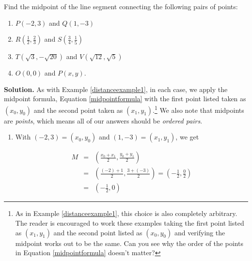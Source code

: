 \documentclass{ximera}
\begin{document}
\begin{example} 

Find the midpoint of the line segment connecting the following pairs of points:  



\begin{enumerate}

\item $P(-2,3)$ and  $Q(1,-3)$ 

\item $R\left( \frac{1}{2}, \frac{2}{3}\right)$ and $S\left( \frac{3}{4}, \frac{1}{5}\right)$ 


\item  $T(\sqrt{3}, -\sqrt{20})$ and $V(\sqrt{12}, \sqrt{5})$

\item   $O(0,0)$ and $P(x,y)$. 

\end{enumerate}


 

{\bf Solution.}  As with Example \ref{distanceexample1}, in each case, we apply the midpoint formula, Equation \ref{midpointformula} with the first point listed taken as  $\left(x_0, y_0\right)$ and the second point taken as $\left(x_1, y_1\right)$.\footnote{As in Example \ref{distanceexample1}, this choice is also completely arbitrary.  The reader is encouraged to work these examples taking the first point listed as $\left(x_1, y_1\right)$ and the second point listed as $\left(x_0, y_0\right)$ and verifying the midpoint works out to be the same.  Can you see why the order of the points in Equation \ref{midpointformula} doesn't matter?}  We also note that midpoints are \textit{points}, which means all of our answers should be \textit{ordered pairs}.

\begin{enumerate}

\item  With $(-2,3) =  \left(x_0, y_0\right)$ and  $(1,-3) = \left(x_1, y_1\right)$, we get

\setlength{\extrarowheight}{10pt}

\[ \begin{array}{rcl}
 M & = & \left( \frac{x_0+x_1}{2},  \frac{y_0+y_1}{2} \right) \\
   & = & \left( \frac{(-2)+1}{2},  \frac{3+(-3)}{2} \right)  = \left(- \frac{1}{2}, \frac{0}{2} \right) \\
   & = & \left(- \frac{1}{2}, 0 \right) 
   \end{array} \]
   

\end{enumerate}
\end{example}
\end{document}
